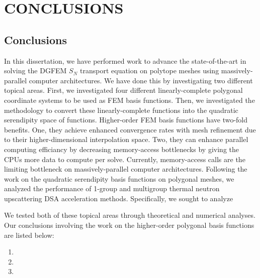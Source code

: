 %
%
%
\chapter{\uppercase {Conclusions}}
\label{sec::Conclusions}


\section{Conclusions}
\label{sec::Conclusions_Conclusions}

In this dissertation, we have performed work to advance the state-of-the-art in solving the DGFEM $S_N$ transport equation on polytope meshes using massively-parallel computer architectures. We have done this by investigating two different topical areas. First, we investigated four different linearly-complete polygonal coordinate systems to be used as FEM basis functions. Then, we investigated the methodology to convert these linearly-complete functions into the quadratic serendipity space of functions. Higher-order FEM basis functions have two-fold benefits. One, they achieve enhanced convergence rates with mesh refinement due to their higher-dimensional interpolation space. Two, they can enhance parallel computing efficiancy by decreasing memory-access bottlenecks by giving the CPUs more data to compute per solve. Currently, memory-access calls are the limiting bottleneck on massively-parallel computer architectures. Following the work on the quadratic serendipity basis functions on polygonal meshes, we analyzed the performance of 1-group and multigroup thermal neutron upscattering DSA acceleration methods. Specifically, we sought to analyze 

We tested both of these topical areas through theoretical and numerical analyses. Our conclusions involving the work on the higher-order polygonal basis functions are listed below:

\begin{enumerate}
\item
\item
\item
\end{enumerate}

